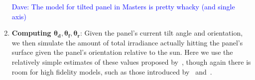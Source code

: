 \documentclass[11pt]{article}
\newcommand{\dnote}[1]{\textcolor{blue}{Dave: #1}}
\begin{document}
\begin{enumerate}
\dnote{The model for tilted panel in Masters is pretty whacky (and single axis)}

\item {\bf Computing $\pmb{\theta_d, \theta_f, \theta_r}$}: Given the panel's current tilt angle and orientation, we then simulate the amount of total irradiance actually hitting the panel's surface given the panel's orientation relative to the sun. Here we use the relatively simple estimates of these values proposed by~\citet{masters2013renewable}, though again there is room for high fidelity models, such as those introduced by~\citet{andersen1980comments} and~\citet{klein1977calculation}.

\end{enumerate}
\end{document}

